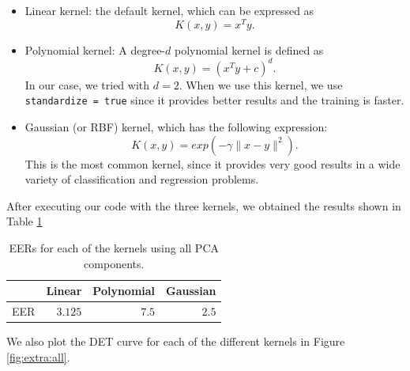 \documentclass[a4paper]{article}
\def\inline{\lstinline[basicstyle=\ttfamily,keywordstyle={}]}
\begin{document}
\begin{itemize}
\item Linear kernel: the default kernel, which can be expressed as
\[
K(x,y) = x^T y.  
\]
\item Polynomial kernel: A degree-\(d\) polynomial kernel is defined as
\[
K(x,y) = (x^T y + c)^d.  
\]
In our case, we tried with \(d = 2\). When we use this kernel, we use \inline{standardize = true} since it provides better results and the training is faster.
\item Gaussian (or RBF) kernel, which has the following expression:
\[
K(x,y) = exp(-\gamma \lVert x- y \rVert^2).  
\]
This is the most common kernel, since it provides very good results in a wide variety of classification and regression problems.
\end{itemize}

After executing our code with the three kernels, we obtained the results shown in Table \ref{table:extra}

\begin{table}[H]
  \centering
  \begin{tabular}{l|lll}
      & Linear                      & Polynomial                & Gaussian                  \\ \hline
  EER & \multicolumn{1}{r}{$3.125$} & \multicolumn{1}{r}{$7.5$} & \multicolumn{1}{r}{$2.5$}
  \end{tabular}
  \caption{EERs for each of the kernels using all PCA components.}
  \label{table:extra}
  \end{table}

  We also plot the DET curve for each of the different kernels in Figure \ref{fig:extra:all}.
\end{document}
